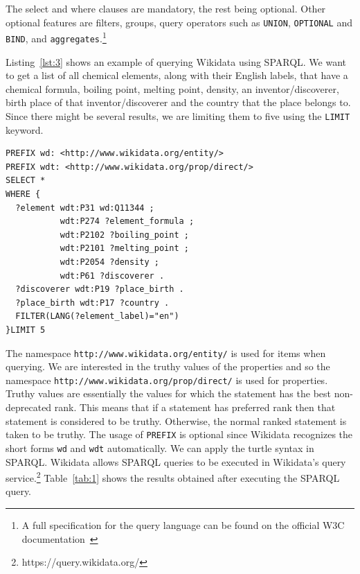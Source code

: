 The select and where clauses are mandatory, the rest being optional. Other optional features are filters, groups, query operators such as \texttt{UNION}, \texttt{OPTIONAL} and \texttt{BIND}, and \texttt{aggregates}.\footnote{A full specification for the query language can be found on the official W3C documentation~\cite{Seaborne}}

Listing~\ref{lst:3} shows an example of querying Wikidata using SPARQL. We want to get a list of all chemical elements, along with their English labels, that have a chemical formula, boiling point, melting point, density, an inventor/discoverer, birth place of that inventor/discoverer and the country that the place belongs to. Since there might be several results, we are limiting them to five using the \texttt{LIMIT} keyword. 


\begin{minipage}{\linewidth}
\begin{lstlisting}[label=lst:3, caption={Querying Wikidata with SPARQL}, language=SPARQL]
PREFIX wd: <http://www.wikidata.org/entity/>
PREFIX wdt: <http://www.wikidata.org/prop/direct/>
SELECT *
WHERE {
  ?element wdt:P31 wd:Q11344 ;
           wdt:P274 ?element_formula ; 
           wdt:P2102 ?boiling_point ;
           wdt:P2101 ?melting_point ;
           wdt:P2054 ?density ;
           wdt:P61 ?discoverer .
  ?discoverer wdt:P19 ?place_birth .
  ?place_birth wdt:P17 ?country .
  FILTER(LANG(?element_label)="en")
}LIMIT 5
\end{lstlisting}
\end{minipage}

The namespace \texttt{http://www.wikidata.org/entity/} is used for items when querying. We are interested in the truthy values of the properties and so the namespace \texttt{http://www.wikidata.org/prop/direct/} is used for properties. Truthy values are essentially the values for which the statement has the best non-deprecated rank. This means that if a statement has preferred rank then that statement is considered to be truthy. Otherwise, the normal ranked statement is taken to be truthy. The usage of \texttt{PREFIX} is optional since Wikidata recognizes the short forms \texttt{wd} and \texttt{wdt} automatically. We can apply the turtle syntax in SPARQL. Wikidata allows SPARQL queries to be executed in Wikidata's query service.\footnote{https://query.wikidata.org/} Table~\ref{tab:1} shows the results obtained after executing the SPARQL query.

